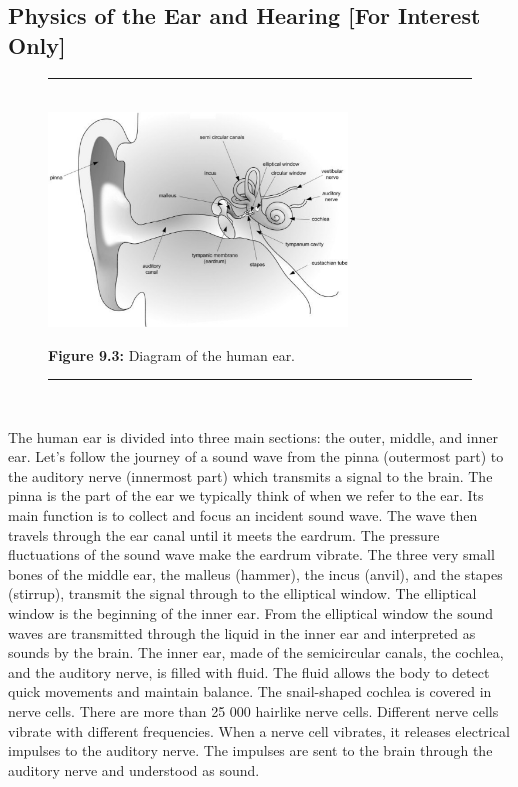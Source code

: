             \subsection{ Physics of the Ear and Hearing [For Interest Only]}
            \nopagebreak
    \setcounter{subfigure}{0}
	\begin{figure}[H] %
    \begin{center}
    \rule[.1in]{\figurerulewidth}{.005in} \\
        \label{m38800*uid9!!!underscore!!!media}\label{m38800*uid9!!!underscore!!!printimage}\includegraphics[width=300px]{col11305.imgs/m38800_HumanEar-GrayScale.png} %
      \vspace{2pt}
    \vspace{\rubberspace}\par \begin{cnxcaption}
	  \small \textbf{Figure 9.3: }Diagram of the human ear.
	\end{cnxcaption}
    \vspace{.1in}
    \rule[.1in]{\figurerulewidth}{.005in} \\
    \end{center}
 \end{figure}       
      \label{m38800*id184052}The human ear is divided into three main sections: the outer, middle,
and inner ear. Let's follow the journey of a sound wave from the pinna (outermost part) to the auditory nerve (innermost part) which transmits a signal to the brain. The pinna is the part of the ear we typically think of when we refer to the ear. Its main
function is to collect and focus an incident sound wave. The wave
then travels through the ear canal until it meets the eardrum. The
pressure fluctuations of the sound wave make the eardrum vibrate.
The three very small bones of the middle ear, the malleus (hammer),
the incus (anvil), and the stapes (stirrup), transmit the signal through
to the elliptical window. The elliptical window is the beginning of the
inner ear. From the elliptical window the sound waves are transmitted through the liquid
in the inner ear and interpreted as sounds by the brain.
The inner ear, made of the semicircular canals, the cochlea,
and the auditory nerve, is filled with fluid. The fluid allows the body to
detect quick movements and maintain balance. The snail-shaped cochlea
is covered in nerve cells. There are more than 25 000 hairlike
nerve cells. Different nerve cells vibrate with different
frequencies. When a nerve cell vibrates, it releases electrical impulses
to the auditory nerve. The impulses are sent to the brain through the
auditory nerve and understood as sound.\par 
    \label{m38800*cid6}
